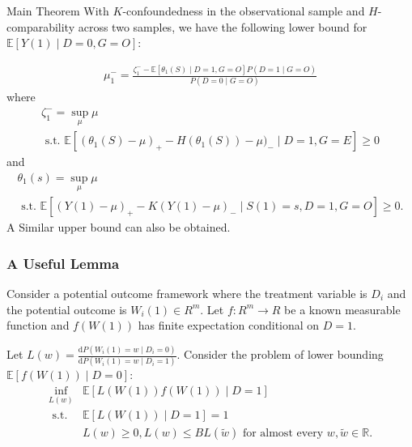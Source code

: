 \documentclass{beamer}					%
\newcommand{\Ep}{\mathbb{E}}
\begin{document}
\begin{frame}{Main Theorem}
    With $K$-confoundedness in the observational sample and $H$-comparability across two samples, we have the following lower bound for $\Ep[Y(1) \mid D = 0, G = O]$:
			
			\begin{equation*}
			\begin{array}{ll}
			\mu_1^- =  \frac{\zeta_1^- - \Ep[\theta_1(S) \mid D=1, G=O] P(D=1\mid G=O)}{P(D = 0 \mid G = O)}
			\end{array}
			\end{equation*}
			where 
			\begin{equation*}
			\begin{array}{ll}
			\zeta_1^- =  \sup _{\mu}  \mu \\
			 \text { s.t. }   \mathbb{E}\left[(\theta_1(S)-\mu)_{+}-H(\theta_1(S))-\mu)_{-} \mid D=1, G = E\right] \geq 0
			\end{array}
			\end{equation*}
			and
			\begin{equation*}
			\begin{array}{ll}
			\theta_1(s) =  \sup _{\mu}  \mu \\
			\text { s.t. }   \mathbb{E}\left[(Y(1)-\mu)_{+}-K(Y(1)-\mu)_{-} \mid S(1)=s, D=1, G = O\right] \geq 0.
			\end{array}
		\end{equation*}
		A Similar upper bound can also be obtained.
\end{frame}

\begin{frame}\frametitle{A Useful Lemma}
    Consider a potential outcome framework where the treatment variable is $D_i$ and the potential outcome is $W_i(1) \in R^m$. Let $f:R^m \to R$ be a known measurable function and $f(W(1))$ has finite expectation conditional on $D = 1$.

        Let $L(w) = \frac{\mathrm{d} P(W_i(1) = w \mid D_i = 0)}{\mathrm{d} P(W_i(1) = w \mid D_i = 1)}$.
        Consider the problem of lower bounding $\Ep[f(W(1)) \mid D = 0]$:
        \begin{equation*}
            \begin{array}{ll}
            \inf _{L(w)} & \mathbb{E}[L(W(1))f(W(1)) \mid D=1] \\
            \text { s.t. } & \mathbb{E}[L(W(1)) \mid D=1]=1 \\
            & L(w) \geq 0, L(w) \leq B L(\tilde{w}) \text { for almost every } w, \tilde{w} \in \mathbb{R}.
            \end{array}
            \end{equation*}
    \end{frame}
    
\end{document}
